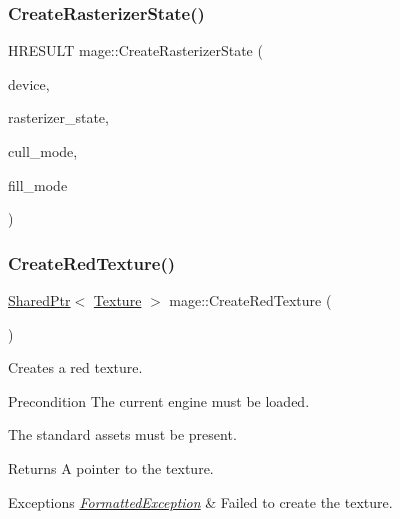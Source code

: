 \hypertarget{namespacemage_a801f8c5a484129ae6717733de626b625}{}\label{namespacemage_a801f8c5a484129ae6717733de626b625} 
\subsubsection{\texorpdfstring{Create\+Rasterizer\+State()}{CreateRasterizerState()}}
{\footnotesize\ttfamily H\+R\+E\+S\+U\+LT mage\+::\+Create\+Rasterizer\+State (\begin{DoxyParamCaption}\item[{I\+D3\+D11\+Device2 $\ast$}]{device,  }\item[{I\+D3\+D11\+Rasterizer\+State $\ast$$\ast$}]{rasterizer\+\_\+state,  }\item[{D3\+D11\+\_\+\+C\+U\+L\+L\+\_\+\+M\+O\+DE}]{cull\+\_\+mode,  }\item[{D3\+D11\+\_\+\+F\+I\+L\+L\+\_\+\+M\+O\+DE}]{fill\+\_\+mode }\end{DoxyParamCaption})}

\hypertarget{namespacemage_adf1d25e4497d1d0305d5bd755bc6860e}{}\label{namespacemage_adf1d25e4497d1d0305d5bd755bc6860e} 
\subsubsection{\texorpdfstring{Create\+Red\+Texture()}{CreateRedTexture()}}
{\footnotesize\ttfamily \hyperlink{namespacemage_a1e01ae66713838a7a67d30e44c67703e}{Shared\+Ptr}$<$ \hyperlink{classmage_1_1_texture}{Texture} $>$ mage\+::\+Create\+Red\+Texture (\begin{DoxyParamCaption}{ }\end{DoxyParamCaption})}

Creates a red texture.

\begin{DoxyPrecond}{Precondition}
The current engine must be loaded. 

The standard assets must be present. 
\end{DoxyPrecond}
\begin{DoxyReturn}{Returns}
A pointer to the texture. 
\end{DoxyReturn}

\begin{DoxyExceptions}{Exceptions}
{\em \hyperlink{structmage_1_1_formatted_exception}{Formatted\+Exception}} & Failed to create the texture. \\
\hline
\end{DoxyExceptions}
\hypertarget{namespacemage_aba8cfdff9edf018ab6ebe2f3f72a2095}{}\label{namespacemage_aba8cfdff9edf018ab6ebe2f3f72a2095} 
